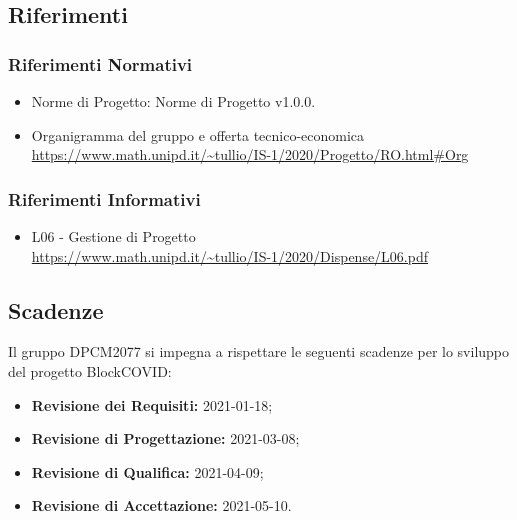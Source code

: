 \subsection{Riferimenti}
\subsubsection{Riferimenti Normativi}
\begin{itemize}
	\item Norme di Progetto: Norme di Progetto v1.0.0.
    \item{Organigramma del gruppo e offerta tecnico-economica} \\
 \url{https://www.math.unipd.it/~tullio/IS-1/2020/Progetto/RO.html#Org}
\end{itemize}
\subsubsection{Riferimenti Informativi}
\begin{itemize}
	\item {L06 - Gestione di Progetto} \\
 \url{https://www.math.unipd.it/~tullio/IS-1/2020/Dispense/L06.pdf}
\end{itemize}

\subsection{Scadenze}
Il gruppo DPCM2077 si impegna a rispettare le seguenti scadenze per lo sviluppo del progetto BlockCOVID:
\begin{itemize}
	\item \textbf{Revisione dei Requisiti:} 2021-01-18; \\
	\item \textbf{Revisione di Progettazione:} 2021-03-08; \\
	\item \textbf{Revisione di Qualifica:} 2021-04-09; \\
	\item \textbf{Revisione di Accettazione:} 2021-05-10. \\
\end{itemize}




